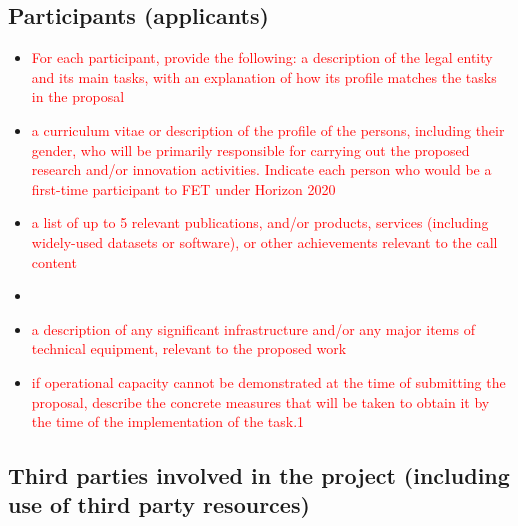 \documentclass[11pt, a4paper]{article} %
\begin{document}
 \subsection{Participants (applicants)}

 \begin{itemize}
 \item \textcolor{red}{For each participant, provide the following: a
     description of the legal entity and its main tasks, with an
     explanation of how its profile matches the tasks in the proposal}
 \item \textcolor{red}{a curriculum vitae or description of the
     profile of the persons, including their gender, who will be
     primarily responsible for carrying out the proposed research
     and/or innovation activities. Indicate each person who would be a
     first-time participant to FET under Horizon 2020}
\item \textcolor{red}{a list of up to 5 relevant publications, and/or
    products, services (including widely-used datasets or software),
    or other achievements relevant to the call content}
\item {}
 \item \textcolor{red}{a description of any significant infrastructure
     and/or any major items of technical equipment, relevant to the
     proposed work}
 \item \textcolor{red}{if operational capacity cannot be demonstrated
     at the time of submitting the proposal, describe the concrete
     measures that will be taken to obtain it by the time of the
     implementation of the task.1}
 \end{itemize}

 \subsection{Third parties involved in the project (including use of third party resources)}
\end{document}
